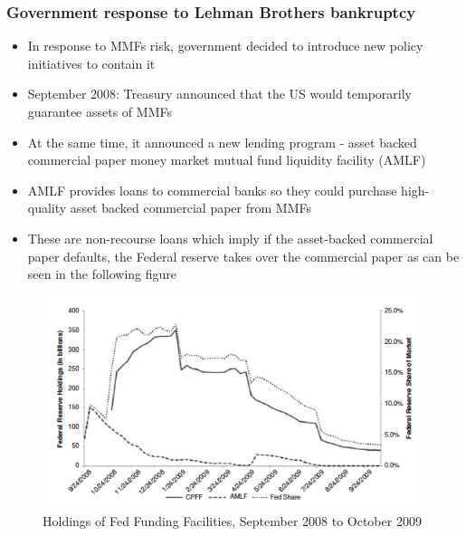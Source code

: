 \documentclass[11pt]{beamer}
\begin{document}
\begin{frame}
\frametitle{Government response to Lehman Brothers bankruptcy}
\begin{itemize}
\item In response to MMFs risk, government decided to introduce new policy initiatives to contain it
\item September 2008: Treasury announced that the US would temporarily guarantee assets of MMFs
\item At the same time, it announced a new lending program - asset backed commercial paper money market mutual fund liquidity facility (AMLF)
\item AMLF provides loans to commercial banks so they could purchase high-quality asset backed commercial paper from MMFs
\item These are non-recourse loans which imply if the asset-backed commercial paper defaults, the Federal reserve takes over the commercial paper as can be seen in the following figure
\end{itemize}
\end{frame}

\begin{frame}
\begin{figure}
\includegraphics[width=\textwidth]{10_5.png}
\caption{Holdings of Fed Funding Facilities, September 2008 to October
2009}
\end{figure}
\end{frame}
\end{document}
